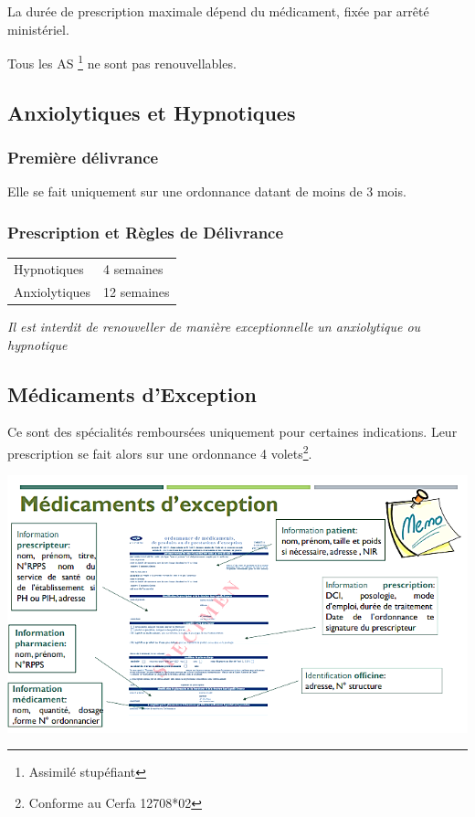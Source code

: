 \documentclass[11pt]{article}
\begin{document}
La durée de prescription maximale dépend du médicament, fixée par arrêté ministériel.

Tous les AS \footnote{Assimilé stupéfiant} ne sont pas renouvellables.

\subsection{Anxiolytiques et Hypnotiques}
\label{sec:orge028f5e}

\subsubsection{Première délivrance}
\label{sec:org04fb687}
Elle se fait uniquement sur une ordonnance datant de moins de 3 mois.

\subsubsection{Prescription et Règles de Délivrance}
\label{sec:org6b3ba0c}
\begin{center}
\begin{tabular}{ll}
Hypnotiques & 4 semaines\\
Anxiolytiques & 12 semaines\\
\end{tabular}
\end{center}

\emph{Il est interdit de renouveller de manière exceptionnelle un anxiolytique ou hypnotique}

\subsection{Médicaments d'Exception}
\label{sec:org8e18c4f}
Ce sont des spécialités remboursées uniquement pour certaines indications.
Leur prescription se fait alors sur une ordonnance 4 volets\footnote{Conforme au Cerfa 12708*02}.

\begin{center}
\includegraphics[width=.9\linewidth]{./exception.png}
\end{center}
\end{document}
